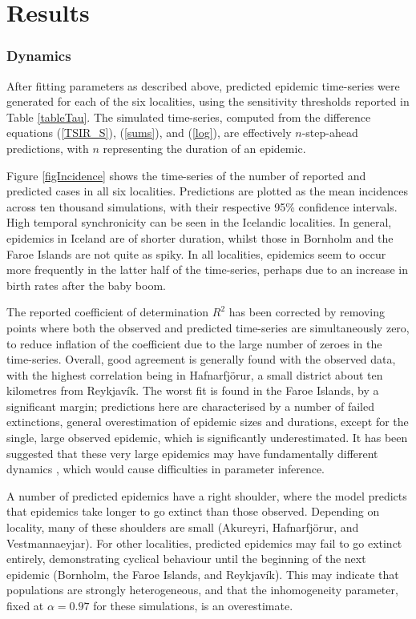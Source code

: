 \documentclass[10pt]{article}
\begin{document}
\section*{Results}

\subsubsection*{Dynamics}

After fitting parameters as described above, predicted epidemic time-series were generated for each of the six localities, using the sensitivity thresholds reported in Table \ref{tableTau}. The simulated time-series, computed from the difference equations (\ref{TSIR_S}), (\ref{sums}), and (\ref{log}), are effectively $n$-step-ahead predictions, with $n$ representing the duration of an epidemic.

Figure \ref{figIncidence} shows the time-series of the number of reported and predicted cases in all six localities. Predictions are plotted as the mean incidences across ten thousand simulations, with their respective 95\% confidence intervals. High temporal synchronicity can be seen in the Icelandic localities. In general, epidemics in Iceland are of shorter duration, whilst those in Bornholm and the Faroe Islands are not quite as spiky. In all localities, epidemics seem to occur more frequently in the latter half of the time-series, perhaps due to an increase in birth rates after the baby boom. 

The reported coefficient of determination $R^2$ has been corrected by removing points where both the observed and predicted time-series are simultaneously zero, to reduce inflation of the coefficient due to the large number of zeroes in the time-series. Overall, good agreement is generally found with the observed data, with the highest correlation being in Hafnarfj\"{o}r\dh{}ur, a small district about ten kilometres from Reykjav\'{i}k. The worst fit is found in the Faroe Islands, by a significant margin; predictions here are characterised by a number of failed extinctions, general overestimation of epidemic sizes and durations, except for the single, large observed epidemic, which is significantly underestimated. It has been suggested that these very large epidemics may have fundamentally different dynamics \cite{Rhodes1996}, which would cause difficulties in parameter inference.

A number of predicted epidemics have a right shoulder, where the model predicts that epidemics take longer to go extinct than those observed. Depending on locality, many of these shoulders are small (Akureyri, Hafnarfj\"{o}r\dh{}ur, and Vestmannaeyjar). For other localities, predicted epidemics may fail to go extinct entirely, demonstrating cyclical behaviour until the beginning of the next epidemic (Bornholm, the Faroe Islands, and Reykjav\'{i}k). This may indicate that populations are strongly heterogeneous, and that the inhomogeneity parameter, fixed at $\alpha=0.97$ for these simulations, is an overestimate.
\end{document}
